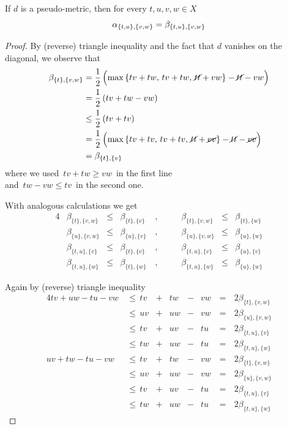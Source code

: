 \documentclass[./main.tex]{subfiles}
\begin{document}
\begin{proposition} \label{prop:aeqb}
    If $d$ is a pseudo-metric, then for every $t,u,v,w \in X$
    \[ \alpha_{\{t,u\},\{v,w\}} = \beta_{\{t,u\},\{v,w\}} \nospblw \]
\end{proposition}
\begin{proof}
    By (reverse) triangle inequality and the fact that $d$ vanishes on the diagonal, we observe that
    \begin{align*}
        \beta_{\{t\},\{v,w\}} &= \frac{1}{2}\, \Bigl( \max {\{ tv + tw,\, tv + tw,\, \cancel{tt} + vw \}} - \cancel{tt} - vw \Bigr) \\
        &= \frac{1}{2}\, (tv + tw - vw) \\
        &\leq \frac{1}{2}\, (tv + tv) \\
        &= \frac{1}{2}\, \Bigl( \max {\{ tv + tv,\, tv + tv,\, \cancel{tt} + \cancel{vv} \}} - \cancel{tt} - \cancel{vv} \Bigr) \\
        &= \beta_{\{t\},\{v\}}
    \end{align*}
    where we used $\, tv + tw \geq vw \,$ in the first line \\
    \bsp and $\, tw - vw \leq tv \,$ in the second one.

    With analogous calculations we get
    \begin{alignat*}{4}
        &\beta_{\{t\},\{v,w\}} &{}\leq{}& \beta_{\{t\},\{v\}} \,&,& \qquad \beta_{\{t\},\{v,w\}} &{}\leq{}& \beta_{\{t\},\{w\}} \\
        &\beta_{\{u\},\{v,w\}} &{}\leq{}& \beta_{\{u\},\{v\}} \,&,& \qquad \beta_{\{u\},\{v,w\}} &{}\leq{}& \beta_{\{u\},\{w\}} \\
        &\beta_{\{t,u\},\{v\}} &{}\leq{}& \beta_{\{t\},\{v\}} \,&,& \qquad \beta_{\{t,u\},\{v\}} &{}\leq{}& \beta_{\{u\},\{v\}} \\
        &\beta_{\{t,u\},\{w\}} &{}\leq{}& \beta_{\{t\},\{w\}} \,&,& \qquad \beta_{\{t,u\},\{w\}} &{}\leq{}& \beta_{\{u\},\{w\}}
    \end{alignat*}

    Again by (reverse) triangle inequality
    \begin{alignat*}{4}
        tv + uw - tu -vw &\,\leq\, tv &{}+{}& tw &{}-{}& vw &\,{}={}\,& 2\beta_{\{t\},\{v,w\}} \\
        &\,\leq\, uv &{}+{}& uw &{}-{}& vw &\,{}={}\,& 2\beta_{\{u\},\{v,w\}} \\
        &\,\leq\, tv &{}+{}& uv &{}-{}& tu &\,{}={}\,& 2\beta_{\{t,u\},\{v\}} \\
        &\,\leq\, tw &{}+{}& uw &{}-{}& tu &\,{}={}\,& 2\beta_{\{t,u\},\{w\}} \\
        uv + tw - tu - vw &\,\leq\, tv &{}+{}& tw &{}-{}& vw &\,{}={}\,& 2\beta_{\{t\},\{v,w\}} \\
        &\,\leq\, uv &{}+{}& uw &{}-{}& vw &\,{}={}\,& 2\beta_{\{u\},\{v,w\}} \\
        &\,\leq\, tv &{}+{}& uv &{}-{}& tu &\,{}={}\,& 2\beta_{\{t,u\},\{v\}} \\
        &\,\leq\, tw &{}+{}& uw &{}-{}& tu &\,{}={}\,& 2\beta_{\{t,u\},\{w\}}
    \end{alignat*}


\end{proof}
\end{document}
